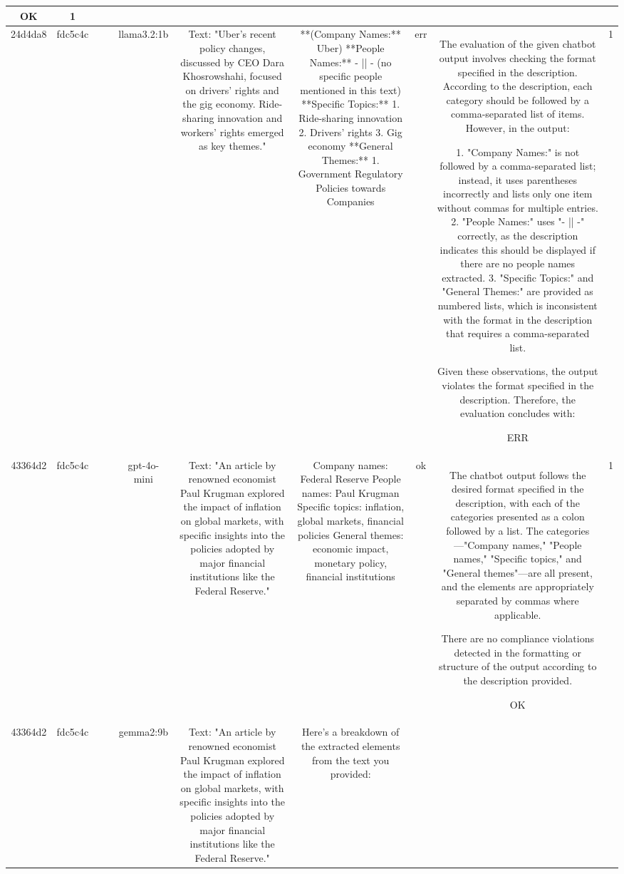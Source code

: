 \begin{table}[h!]
\begin{tabular}{|c|c|c|c|c|c|c|c|c|c|}
OK & 1\\
\hline
24d4da8 & fdc5c4c &  &  & llama3.2:1b & Text: "Uber's recent policy changes, discussed by CEO Dara Khosrowshahi, focused on drivers' rights and the gig economy. Ride-sharing innovation and workers' rights emerged as key themes." & **(Company Names:** Uber)
**People Names:** - || - (no specific people mentioned in this text)
**Specific Topics:** 
 1. Ride-sharing innovation
 2. Drivers' rights
 3. Gig economy
**General Themes:** 
 1. Government Regulatory Policies towards Companies & err & The evaluation of the given chatbot output involves checking the format specified in the description. According to the description, each category should be followed by a comma-separated list of items. However, in the output:

1. "Company Names:" is not followed by a comma-separated list; instead, it uses parentheses incorrectly and lists only one item without commas for multiple entries.
2. "People Names:" uses "- || -" correctly, as the description indicates this should be displayed if there are no people names extracted.
3. "Specific Topics:" and "General Themes:" are provided as numbered lists, which is inconsistent with the format in the description that requires a comma-separated list.

Given these observations, the output violates the format specified in the description. Therefore, the evaluation concludes with:

ERR & 1\\
\hline
43364d2 & fdc5c4c &  &  & gpt-4o-mini & Text: "An article by renowned economist Paul Krugman explored the impact of inflation on global markets, with specific insights into the policies adopted by major financial institutions like the Federal Reserve." & Company names: Federal Reserve
People names: Paul Krugman
Specific topics: inflation, global markets, financial policies
General themes: economic impact, monetary policy, financial institutions & ok & The chatbot output follows the desired format specified in the description, with each of the categories presented as a colon followed by a list. The categories—"Company names," "People names," "Specific topics," and "General themes"—are all present, and the elements are appropriately separated by commas where applicable. 

There are no compliance violations detected in the formatting or structure of the output according to the description provided. 

OK & 1\\
\hline
43364d2 & fdc5c4c &  &  & gemma2:9b & Text: "An article by renowned economist Paul Krugman explored the impact of inflation on global markets, with specific insights into the policies adopted by major financial institutions like the Federal Reserve." & Here's a breakdown of the extracted elements from the text you provided:


\end{tabular}
\end{table}
